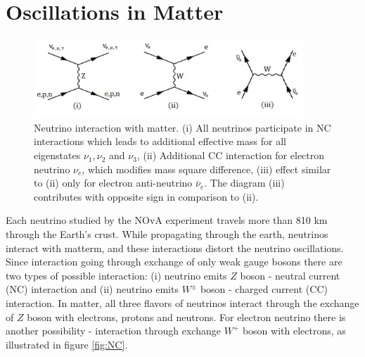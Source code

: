 \section{Oscillations in Matter}
\begin{figure}
\includegraphics[width=0.9\textwidth]{figures/NC_and_CC_currents.pdf}
\centering
\caption{Neutrino interaction with matter. (i) All neutrinos participate in NC interactions which 
leads to additional effective mass for all eigenstates $\nu_1, \nu_2$ and $\nu_3$, (ii) Additional 
CC interaction for electron neutrino $\nu_e$, which modifies mass square difference, (iii) effect 
similar to (ii) only for electron anti-neutrino $\bar{\nu}_e$. The diagram (iii) contributes with 
opposite sign in comparison to (ii).} 
\end{figure}

Each neutrino studied by the NOvA experiment travels more than 810 km through the Earth's crust.
While propagating through the earth, neutrinos interact with matterm, and these interactions
distort the neutrino oscillations. Since interaction going through 
exchange of only weak gauge bosons there are two types of possible interaction: (i) neutrino 
emits $Z$ boson - neutral current (NC) interaction and (ii) neutrino emits $W^\pm$ boson - 
charged current (CC) interaction. In matter, all three flavors of neutrinos interact through 
the exchange of $Z$ boson with electrons, protons and neutrons. For electron neutrino there 
is another possibility - interaction through exchange $W^+$ boson with electrons, as illustrated  
in figure \ref{fig:NC}.

